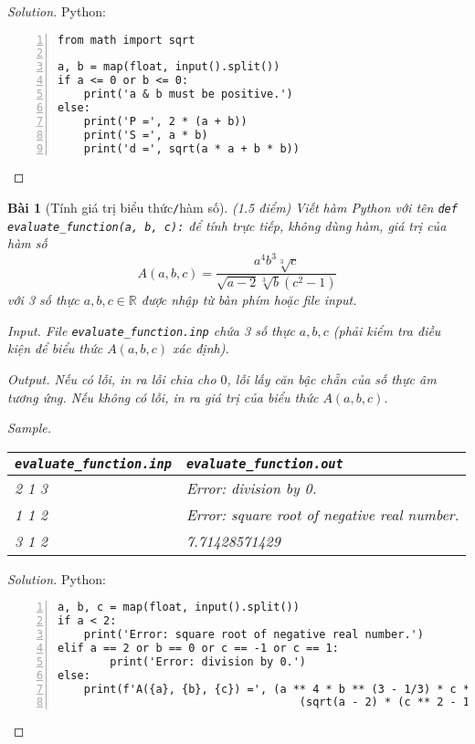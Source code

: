 \documentclass{article}
\newtheorem{baitoan}{Bài}
\begin{document}
\begin{proof}[Solution]
    Python:
    \begin{Verbatim}[numbers=left,xleftmargin=5mm]
from math import sqrt

a, b = map(float, input().split())
if a <= 0 or b <= 0:
	print('a & b must be positive.')
else:
	print('P =', 2 * (a + b))
	print('S =', a * b)
	print('d =', sqrt(a * a + b * b))
    \end{Verbatim}
\end{proof}

\begin{baitoan}[Tính giá trị biểu thức{\tt/}hàm số]
	{\rm(1.5 điểm)} Viết hàm Python với tên \verb|def evaluate_function(a, b, c):| để tính trực tiếp, không dùng hàm, giá trị của hàm số
	\begin{equation*}
		A(a,b,c) = \frac{a^4b^3\sqrt[3]{c}}{\sqrt{a - 2}\sqrt[3]{b}(c^2 - 1)}
	\end{equation*}
	với 3 số thực $a,b,c\in\mathbb{R}$ được nhập từ bàn phím hoặc file input.
	\item {\sf Input.} File \verb|evaluate_function.inp| chứa 3 số thực $a,b,c$ (phải kiểm tra điều kiện để biểu thức $A(a,b,c)$ xác định).
	\item {\sf Output.} Nếu có lỗi, in ra lỗi chia cho $0$, lỗi lấy căn bậc chẵn của số thực âm tương ứng. Nếu không có lỗi, in ra giá trị của biểu thức $A(a,b,c)$.
	\item {\sf Sample.}
	\begin{table}[H]
		\centering
		\begin{tabular}{|l|l|}
			\hline
			\verb|evaluate_function.inp| & \verb|evaluate_function.out| \\
			\hline
			2 1 3 & Error: division by 0. \\
			1 1 2 & Error: square root of negative real number. \\
			3 1 2 & 7.71428571429 \\
			\hline
		\end{tabular}
	\end{table}
\end{baitoan}

\begin{proof}[Solution]
    Python:
    \begin{Verbatim}[numbers=left,xleftmargin=5mm]
a, b, c = map(float, input().split())
if a < 2:
	print('Error: square root of negative real number.')
elif a == 2 or b == 0 or c == -1 or c == 1:
		print('Error: division by 0.')
else:
	print(f'A({a}, {b}, {c}) =', (a ** 4 * b ** (3 - 1/3) * c ** (1/3)) /
                                     (sqrt(a - 2) * (c ** 2 - 1)))
    \end{Verbatim}
\end{proof}
\end{document}
